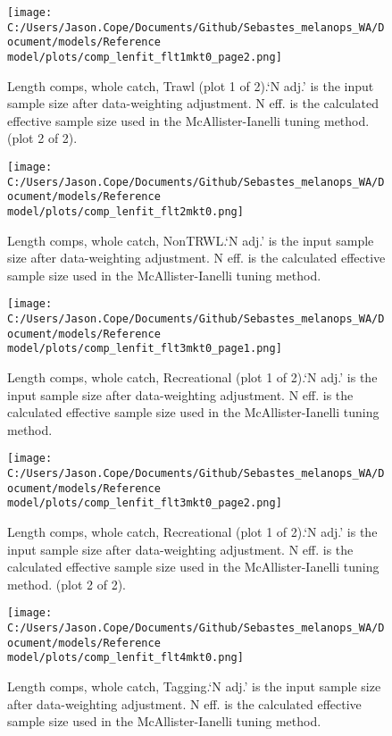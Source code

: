 \documentclass[11pt,
  english,
  letterpaper,
]{article}
\begin{document}
\begin{figure}
\centering
\texttt{[image: C:/Users/Jason.Cope/Documents/Github/Sebastes\_melanops\_WA/Document/models/Reference model/plots/comp\_lenfit\_flt1mkt0\_page2.png]}
\caption{Length comps, whole catch, Trawl (plot 1 of 2).`N adj.' is the input sample size after data-weighting adjustment. N eff. is the calculated effective sample size used in the McAllister-Ianelli tuning method. (plot 2 of 2).\label{fig:comp_lenfit_flt1mkt0_page2}}
\end{figure}

\begin{figure}
\centering
\texttt{[image: C:/Users/Jason.Cope/Documents/Github/Sebastes\_melanops\_WA/Document/models/Reference model/plots/comp\_lenfit\_flt2mkt0.png]}
\caption{Length comps, whole catch, NonTRWL.`N adj.' is the input sample size after data-weighting adjustment. N eff. is the calculated effective sample size used in the McAllister-Ianelli tuning method.\label{fig:comp_lenfit_flt2mkt0}}
\end{figure}

\begin{figure}
\centering
\texttt{[image: C:/Users/Jason.Cope/Documents/Github/Sebastes\_melanops\_WA/Document/models/Reference model/plots/comp\_lenfit\_flt3mkt0\_page1.png]}
\caption{Length comps, whole catch, Recreational (plot 1 of 2).`N adj.' is the input sample size after data-weighting adjustment. N eff. is the calculated effective sample size used in the McAllister-Ianelli tuning method.\label{fig:comp_lenfit_flt3mkt0_page1}}
\end{figure}

\begin{figure}
\centering
\texttt{[image: C:/Users/Jason.Cope/Documents/Github/Sebastes\_melanops\_WA/Document/models/Reference model/plots/comp\_lenfit\_flt3mkt0\_page2.png]}
\caption{Length comps, whole catch, Recreational (plot 1 of 2).`N adj.' is the input sample size after data-weighting adjustment. N eff. is the calculated effective sample size used in the McAllister-Ianelli tuning method. (plot 2 of 2).\label{fig:comp_lenfit_flt3mkt0_page2}}
\end{figure}

\begin{figure}
\centering
\texttt{[image: C:/Users/Jason.Cope/Documents/Github/Sebastes\_melanops\_WA/Document/models/Reference model/plots/comp\_lenfit\_flt4mkt0.png]}
\caption{Length comps, whole catch, Tagging.`N adj.' is the input sample size after data-weighting adjustment. N eff. is the calculated effective sample size used in the McAllister-Ianelli tuning method.\label{fig:comp_lenfit_flt4mkt0}}
\end{figure}
\end{document}
